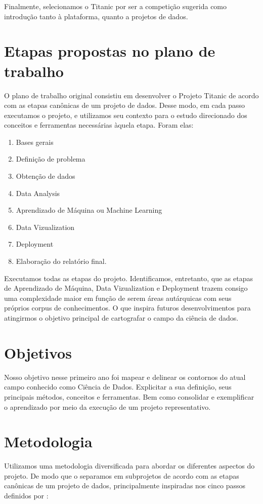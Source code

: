 \documentclass{article}
\begin{document}
Finalmente, selecionamos o Titanic por ser a competição sugerida como introdução tanto à plataforma, quanto a projetos de dados. 

\section{Etapas propostas no plano de trabalho}
O plano de trabalho original consistiu em desenvolver o Projeto Titanic de acordo com as etapas canônicas de um projeto de dados. Desse modo, em cada passo executamos o projeto, e utilizamos seu contexto para o estudo direcionado dos conceitos e ferramentas necessárias àquela etapa. Foram elas:
\begin{enumerate}
\item Bases gerais
\item Definição de problema
\item Obtenção de dados
\item Data Analysis
\item Aprendizado de Máquina ou Machine Learning
\item Data Vizualization
\item Deployment 
\item Elaboração do relatório final.
\end{enumerate}

Executamos todas as etapas do projeto. Identificamos, entretanto, que as etapas de Aprendizado de Máquina, Data Vizualization e Deployment trazem consigo uma complexidade maior em função de serem áreas autárquicas com seus próprios corpus de conhecimentos. O que inspira futuros desenvolvimentos para atingirmos o objetivo principal de cartografar o campo da ciência de dados. 

\section{Objetivos}
Nosso objetivo nesse primeiro ano foi mapear e delinear os contornos do atual campo conhecido como Ciência de Dados. Explicitar a sua definição, seus principais métodos, conceitos e ferramentas. Bem como consolidar e exemplificar o aprendizado por meio da execução de um projeto representativo. 

\section{Metodologia}
Utilizamos uma metodologia diversificada para abordar os diferentes aspectos do projeto. De modo que o separamos em subprojetos de acordo com as etapas canônicas de um projeto de dados, principalmente inspiradas nos cinco passos definidos por \cite{PRINCIPLES}: 
\end{document}

